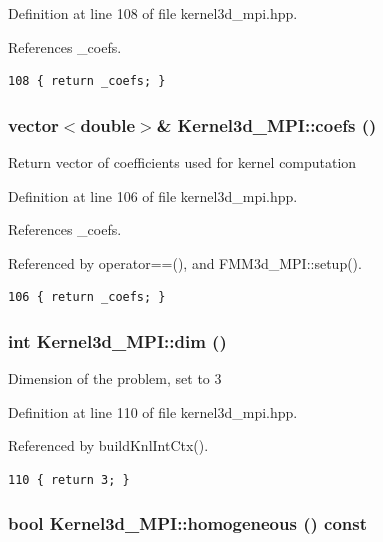 Definition at line 108 of file kernel3d\_\-mpi.hpp.

References \_\-coefs.

\footnotesize\begin{verbatim}108 { return _coefs; }
\end{verbatim}\normalsize 


\subsubsection{\setlength{\rightskip}{0pt plus 5cm}vector$<$double$>$\& Kernel3d\_\-MPI::coefs ()\hspace{0.3cm}{\tt  [inline]}}\label{classKernel3d__MPI_6cee00fd70607c0a0f51594392b6594b_6cee00fd70607c0a0f51594392b6594b}


Return vector of coefficients used for kernel computation 

Definition at line 106 of file kernel3d\_\-mpi.hpp.

References \_\-coefs.

Referenced by operator==(), and FMM3d\_\-MPI::setup().

\footnotesize\begin{verbatim}106 { return _coefs; }
\end{verbatim}\normalsize 


\subsubsection{\setlength{\rightskip}{0pt plus 5cm}int Kernel3d\_\-MPI::dim ()\hspace{0.3cm}{\tt  [inline]}}\label{classKernel3d__MPI_e3f9953141ca7d7525b58c0ff1ef6b1f_e3f9953141ca7d7525b58c0ff1ef6b1f}


Dimension of the problem, set to 3 

Definition at line 110 of file kernel3d\_\-mpi.hpp.

Referenced by build\-Knl\-Int\-Ctx().

\footnotesize\begin{verbatim}110 { return 3; }
\end{verbatim}\normalsize 


\subsubsection{\setlength{\rightskip}{0pt plus 5cm}bool Kernel3d\_\-MPI::homogeneous () const}\label{classKernel3d__MPI_215ba8957cc7ea3494813f5b1c2fc866_215ba8957cc7ea3494813f5b1c2fc866}


